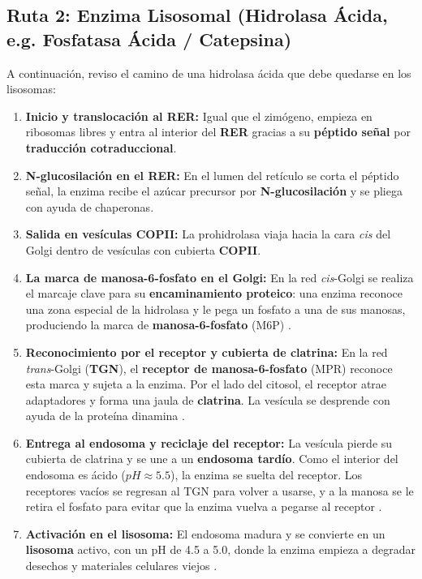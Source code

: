 \documentclass[12pt,spanish,letterpaper,oneside]{article}
\begin{document}
\subsection{Ruta 2: Enzima Lisosomal (Hidrolasa Ácida, e.g. Fosfatasa Ácida / Catepsina)}
A continuación, reviso el camino de una hidrolasa ácida que debe quedarse en los lisosomas:
\begin{enumerate}
    \item \textbf{Inicio y translocación al RER:} Igual que el zimógeno, empieza en ribosomas libres y entra al interior del \textbf{RER} gracias a su \textbf{péptido señal} por \textbf{traducción cotraduccional}.
    \item \textbf{N-glucosilación en el RER:} En el lumen del retículo se corta el péptido señal, la enzima recibe el azúcar precursor por \textbf{N-glucosilación} y se pliega con ayuda de chaperonas.
    \item \textbf{Salida en vesículas COPII:} La prohidrolasa viaja hacia la cara \textit{cis} del Golgi dentro de vesículas con cubierta \textbf{COPII}.
    \item \textbf{La marca de manosa-6-fosfato en el Golgi:} En la red \textit{cis}-Golgi se realiza el marcaje clave para su \textbf{encaminamiento proteico}: una enzima reconoce una zona especial de la hidrolasa y le pega un fosfato a una de sus manosas, produciendo la marca de \textbf{manosa-6-fosfato} (M6P) \parencite{mathews2013bioquimica, alberts2022molecular}.
    \item \textbf{Reconocimiento por el receptor y cubierta de clatrina:} En la red \textit{trans}-Golgi (\textbf{TGN}), el \textbf{receptor de manosa-6-fosfato} (MPR) reconoce esta marca y sujeta a la enzima. Por el lado del citosol, el receptor atrae adaptadores y forma una jaula de \textbf{clatrina}. La vesícula se desprende con ayuda de la proteína dinamina \parencite{lodish2021molecular, fortoul2020histologia}.
    \item \textbf{Entrega al endosoma y reciclaje del receptor:} La vesícula pierde su cubierta de clatrina y se une a un \textbf{endosoma tardío}. Como el interior del endosoma es ácido ($pH \approx 5.5$), la enzima se suelta del receptor. Los receptores vacíos se regresan al TGN para volver a usarse, y a la manosa se le retira el fosfato para evitar que la enzima vuelva a pegarse al receptor \parencite{alberts2022molecular, kierszenbaum2020histologia}.
    \item \textbf{Activación en el lisosoma:} El endosoma madura y se convierte en un \textbf{lisosoma} activo, con un pH de 4.5 a 5.0, donde la enzima empieza a degradar desechos y materiales celulares viejos \parencite{fortoul2020histologia, lieberman2018marks}.
\end{enumerate}
\end{document}
